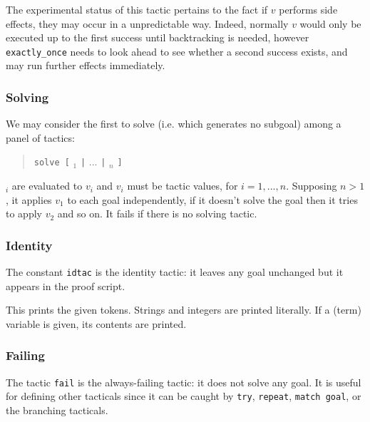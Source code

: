 The experimental status of this tactic pertains to the fact if $v$ performs side effects, they may occur in a unpredictable way. Indeed, normally $v$ would only be executed up to the first success until backtracking is needed, however {\tt exactly\_once} needs to look ahead to see whether a second success exists, and may run further effects immediately.

\ErrMsg {}

\subsubsection[Solving]{Solving
}

We may consider the first to solve (i.e. which generates no subgoal) among a
panel of tactics:
\begin{quote}
{\tt solve [} {\tacexpr}$_1$ {\tt |} $...$ {\tt |} {\tacexpr}$_n$ {\tt ]}
\end{quote}
{\tacexpr}$_i$ are evaluated to $v_i$ and $v_i$ must be tactic values,
for $i=1,...,n$. Supposing $n>1$, it applies $v_1$ to each goal
independently, if it doesn't solve the goal then it tries to apply
$v_2$ and so on. It fails if there is no solving tactic.

\ErrMsg {}

\subsubsection[Identity]{Identity
}

The constant {\tt idtac} is the identity tactic: it leaves any goal
unchanged but it appears in the proof script.


This prints the given tokens. Strings and integers are printed
literally. If a (term) variable is given, its contents are printed.


\subsubsection[Failing]{Failing
}

The tactic {\tt fail} is the always-failing tactic: it does not solve
any goal. It is useful for defining other tacticals since it can be
caught by {\tt try}, {\tt repeat}, {\tt match goal}, or the branching
tacticals.

